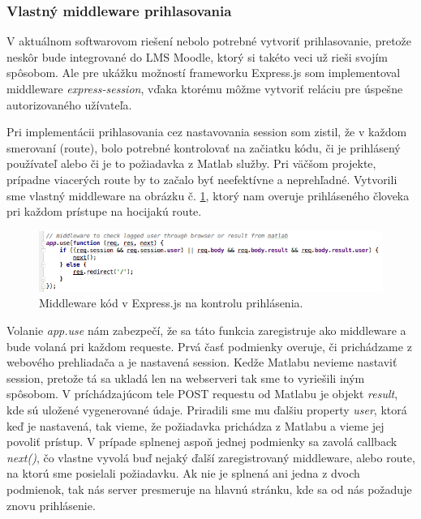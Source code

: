 \subsubsection{Vlastný middleware prihlasovania}
V aktuálnom softwarovom riešení nebolo potrebné vytvoriť prihlasovanie, pretože neskôr bude integrované do LMS Moodle, ktorý si takéto veci už rieši svojím spôsobom. Ale pre ukážku možností frameworku Express.js som implementoval middleware \textit{express-session}, vďaka ktorému môžme vytvoriť reláciu pre úspešne autorizovaného užívateľa. 

Pri implementácii prihlasovania cez nastavovania session som zistil, že v každom smerovaní (route), bolo potrebné kontrolovať na začiatku kódu, či je prihlásený používateľ alebo či je to požiadavka z Matlab služby. Pri väčšom projekte, prípadne viacerých route by to začalo byť neefektívne a neprehľadné. Vytvorili sme vlastný middleware na obrázku č. \ref{img-express-middleware}, ktorý nam overuje prihláseného človeka pri každom prístupe na hocijakú route.

\begin{figure}[H]
  \centering
  \includegraphics[scale=0.6]{img/code/express-middleware.png}
  \caption{Middleware kód v Express.js na kontrolu prihlásenia.}
  \label{img-express-middleware}
\end{figure}

Volanie \textit{app.use} nám zabezpečí, že sa táto funkcia zaregistruje ako middleware a bude volaná pri každom requeste. Prvá časť podmienky overuje, či prichádzame z webového prehliadača a je nastavená session. Kedže Matlabu nevieme nastaviť session, pretože tá sa ukladá len na webserveri tak sme to vyriešili iným spôsobom. V príchádzajúcom tele POST requestu od Matlabu je objekt \textit{result}, kde sú uložené vygenerované údaje. Priradili sme mu ďalšiu property \textit{user}, ktorá keď je nastavená, tak vieme, že požiadavka prichádza z Matlabu a vieme jej povoliť prístup. V prípade splnenej aspoň jednej podmienky sa zavolá callback \textit{next()}, čo vlastne vyvolá buď nejaký ďalší zaregistrovaný middleware, alebo route, na ktorú sme posielali požiadavku.
Ak nie je splnená ani jedna z dvoch podmienok, tak nás server presmeruje na hlavnú stránku, kde sa od nás požaduje znovu prihlásenie.


